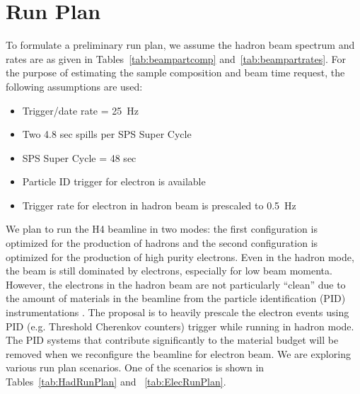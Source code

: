 \section{Run Plan}
\label{sec:runplan}

To formulate a preliminary run plan, we assume the hadron beam spectrum and rates are as given in Tables~\ref{tab:beampartcomp} and~\ref{tab:beampartrates}.   For the purpose of estimating the sample composition and beam time request, the following assumptions are used:
\begin{itemize}
\item { Trigger/date rate = 25~Hz}
\item { Two 4.8 sec spills per SPS Super Cycle }
\item { SPS Super Cycle = 48 sec}
\item { Particle ID trigger for electron is available}
\item { Trigger rate for electron in hadron beam is prescaled to 0.5~Hz}
\end{itemize}
We plan to run the H4 beamline in two modes: the first configuration is optimized for the production of hadrons and the second configuration is optimized for the production of high purity electrons. Even in the hadron mode, the beam is still dominated by electrons, especially for low beam momenta. However, the electrons in the hadron beam are not particularly ``clean'' due to the amount of materials in the beamline from the particle identification (PID) instrumentations .  The proposal is to heavily prescale the electron events using PID (e.g. Threshold Cherenkov counters) trigger while running in hadron mode. The PID systems that contribute significantly to the material budget will be removed when we reconfigure the beamline for electron beam.  We are exploring various run plan scenarios. One of the scenarios is shown in Tables~\ref{tab:HadRunPlan} and ~\ref{tab:ElecRunPlan}. 

